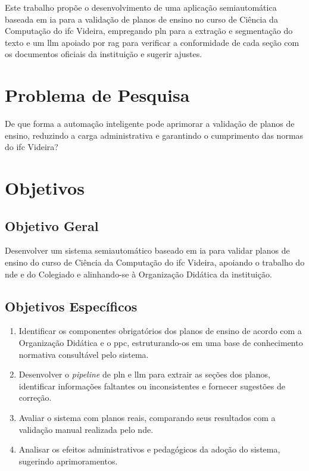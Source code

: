 Este trabalho propõe o desenvolvimento de uma aplicação semiautomática baseada em \gls{ia} para a validação de planos de ensino no curso de Ciência da Computação do \gls{ifc} Videira, empregando \gls{pln} para a extração e segmentação do texto e um \gls{llm} apoiado por \gls{rag} para verificar a conformidade de cada seção com os documentos oficiais da instituição e sugerir ajustes.

\section{Problema de Pesquisa}

De que forma a automação inteligente pode aprimorar a validação de planos de ensino, reduzindo a carga administrativa e garantindo o cumprimento das normas do \gls{ifc} Videira?

\section{Objetivos}

\subsection{Objetivo Geral}
Desenvolver um sistema semiautomático baseado em \gls{ia} para validar planos de ensino do curso de Ciência da Computação do \gls{ifc} Videira, apoiando o trabalho do \gls{nde} e do Colegiado e alinhando-se à Organização Didática da instituição.

\subsection{Objetivos Específicos}

\begin{enumerate}
\item Identificar os componentes obrigatórios dos planos de ensino de acordo com a Organização Didática e o \gls{ppc}, estruturando-os em uma base de conhecimento normativa consultável pelo sistema.
\item Desenvolver o \textit{pipeline} de \gls{pln} e \gls{llm} para extrair as seções dos planos, identificar informações faltantes ou inconsistentes e fornecer sugestões de correção.
\item Avaliar o sistema com planos reais, comparando seus resultados com a validação manual realizada pelo \gls{nde}.
\item Analisar os efeitos administrativos e pedagógicos da adoção do sistema, sugerindo aprimoramentos.
\end{enumerate}

